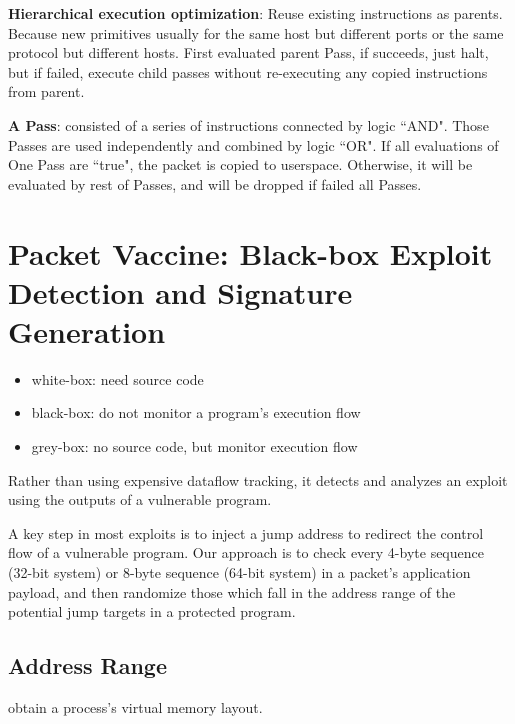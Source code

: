 \documentclass[]{article}
\begin{document}
\textbf{Hierarchical execution optimization}: Reuse existing instructions
as parents. Because new primitives usually for the same host but different
ports or the same protocol but different hosts. First evaluated parent Pass,
if succeeds, just halt, but if failed, execute child passes without re-executing
any copied instructions from parent.

\textbf{A Pass}: consisted of a series of instructions connected by logic
``AND". Those Passes are used independently and combined by logic
``OR". If all evaluations of One Pass are ``true", the packet is copied to
userspace. Otherwise, it will be evaluated by rest of Passes, and will be
dropped if failed all Passes.

\section{Packet Vaccine: Black-box Exploit Detection and 
Signature Generation}
\begin{itemize}
 \item white-box: need source code
 \item black-box: do not monitor a program's execution flow
 \item grey-box: no source code, but monitor execution flow
\end{itemize}

Rather than using expensive dataflow tracking, it detects and analyzes an
 exploit using the outputs of a vulnerable program.

A key step in most exploits is to inject a jump address to redirect the control
flow of a vulnerable program. Our approach is to check every 4-byte 
sequence (32-bit system) or 8-byte sequence (64-bit system) in a packet's
application payload, and then randomize those which fall in the address 
range of the potential jump targets in a protected program. 

\subsection{Address Range}
obtain a process's virtual memory layout.
\end{document}
